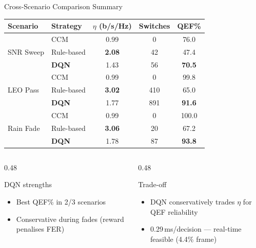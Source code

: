 \documentclass[aspectratio=169,10pt]{beamer}
\begin{document}
\begin{frame}[shrink=20]{Cross-Scenario Comparison Summary}
\begin{center}
\renewcommand{\arraystretch}{1.1}
\small
\begin{tabular}{llccc}
  \toprule
  \textbf{Scenario} & \textbf{Strategy} & \textbf{$\eta$ (b/s/Hz)} &
  \textbf{Switches} & \textbf{QEF\%} \\
  \midrule
  \multirow{3}{*}{SNR Sweep}
    & CCM             & 0.99 & 0   & 76.0 \\
    & Rule-based      & \textbf{2.08} & 42  & 47.4 \\
    & \textbf{DQN}   & 1.43 & 56 & \textbf{70.5} \\
  \midrule
  \multirow{3}{*}{LEO Pass}
    & CCM             & 0.99 & 0   & 99.8 \\
    & Rule-based      & \textbf{3.02} & 410 & 65.0 \\
    & \textbf{DQN}   & 1.77 & 891 & \textbf{91.6} \\
  \midrule
  \multirow{3}{*}{Rain Fade}
    & CCM             & 0.99 & 0  & 100.0 \\
    & Rule-based      & \textbf{3.06} & 20 & 67.2 \\
    & \textbf{DQN}   & 1.78 & 87 & \textbf{93.8} \\
  \bottomrule
\end{tabular}
\end{center}
\vspace{-0.3em}
\begin{columns}[T]
  \begin{column}{0.48\textwidth}
    \begin{resultbox}{DQN strengths}
      \scriptsize
      \begin{itemize}\setlength{\itemsep}{0pt}
        \item Best QEF\% in 2/3 scenarios
        \item Conservative during fades (reward penalises FER)
      \end{itemize}
    \end{resultbox}
  \end{column}
  \begin{column}{0.48\textwidth}
    \begin{notebox}{Trade-off}
      \scriptsize
      \begin{itemize}\setlength{\itemsep}{0pt}
        \item DQN conservatively trades $\eta$ for QEF reliability
        \item 0.29\,ms/decision — real-time feasible (4.4\% frame)
      \end{itemize}
    \end{notebox}
  \end{column}
\end{columns}
\end{frame}
\end{document}
